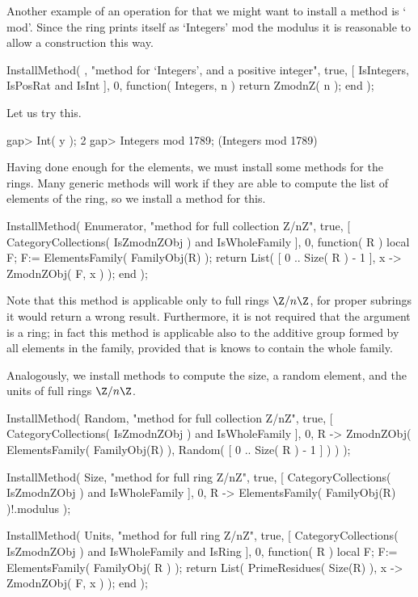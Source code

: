 Another example of an operation for that we might want to install
a method is `\\mod'.
Since the ring prints itself as `Integers' mod the modulus
it is reasonable to allow a construction this way.

\beginexample
    InstallMethod( \mod,
        "method for `Integers', and a positive integer",
        true,
        [ IsIntegers, IsPosRat and IsInt ], 0,
        function( Integers, n ) return ZmodnZ( n ); end );
\endexample

Let us try this.

\beginexample
    gap> Int( y );
    2
    gap> Integers mod 1789;
    (Integers mod 1789)
\endexample

Having done enough for the elements,
we must install some methods for the rings.
Many generic methods will work if they are able to compute the
list of elements of the ring,
so we install a method for this.

\beginexample
    InstallMethod( Enumerator,
        "method for full collection Z/nZ",
        true,
        [ CategoryCollections( IsZmodnZObj ) and IsWholeFamily ], 0,
        function( R )
        local F;
        F:= ElementsFamily( FamilyObj(R) );
        return List( [ 0 .. Size( R ) - 1 ], x -> ZmodnZObj( F, x ) );
        end );
\endexample

Note that this method is applicable only to full rings $\Z/n\Z$,
for proper subrings it would return a wrong result.
Furthermore, it is not required that the argument is a ring;
in fact this method is applicable also to the additive group
formed by all elements in the family,
provided that is knows to contain the whole family.

Analogously, we install methods to compute the size,
a random element, and the units of full rings $\Z/n\Z$.

\beginexample
    InstallMethod( Random,
        "method for full collection Z/nZ",
        true,
        [ CategoryCollections( IsZmodnZObj ) and IsWholeFamily ], 0,
        R -> ZmodnZObj( ElementsFamily( FamilyObj(R) ),
                        Random( [ 0 .. Size( R ) - 1 ] ) ) );

    InstallMethod( Size,
        "method for full ring Z/nZ",
        true,
        [ CategoryCollections( IsZmodnZObj ) and IsWholeFamily ], 0,
        R -> ElementsFamily( FamilyObj(R) )!.modulus );

    InstallMethod( Units,
        "method for full ring Z/nZ",
        true,
        [     CategoryCollections( IsZmodnZObj )
          and IsWholeFamily and IsRing ], 0,
        function( R )
        local F;
        F:= ElementsFamily( FamilyObj( R ) );
        return List( PrimeResidues( Size(R) ), x -> ZmodnZObj( F, x ) );
        end );
\endexample

